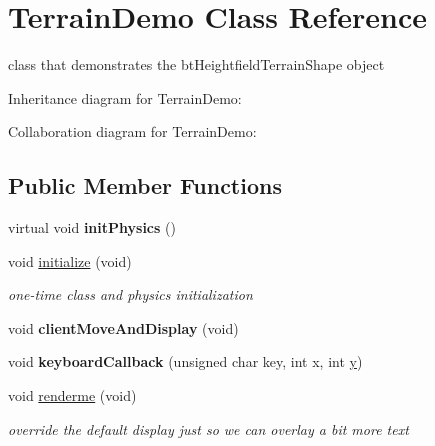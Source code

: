 \hypertarget{class_terrain_demo}{\section{Terrain\+Demo Class Reference}
\label{class_terrain_demo}
}


class that demonstrates the bt\+Heightfield\+Terrain\+Shape object  




Inheritance diagram for Terrain\+Demo\+:


Collaboration diagram for Terrain\+Demo\+:
\subsection*{Public Member Functions}
\begin{DoxyCompactItemize}
\item 
\hypertarget{class_terrain_demo_a76e348084508d2b18be774d0b4a4330e}{virtual void {\bfseries init\+Physics} ()}\label{class_terrain_demo_a76e348084508d2b18be774d0b4a4330e}

\item 
\hypertarget{class_terrain_demo_a571044d29b84f48708d3c8ca85567d8f}{void \hyperlink{class_terrain_demo_a571044d29b84f48708d3c8ca85567d8f}{initialize} (void)}\label{class_terrain_demo_a571044d29b84f48708d3c8ca85567d8f}

\begin{DoxyCompactList}\small\item\em one-\/time class and physics initialization \end{DoxyCompactList}\item 
\hypertarget{class_terrain_demo_ab00ee84fd73d2179ece57db05e952d55}{void {\bfseries client\+Move\+And\+Display} (void)}\label{class_terrain_demo_ab00ee84fd73d2179ece57db05e952d55}

\item 
\hypertarget{class_terrain_demo_a25863388a34683333b49e91866dfad8e}{void {\bfseries keyboard\+Callback} (unsigned char key, int x, int \hyperlink{_ice_utils_8h_aa7ffaed69623192258fb8679569ff9ba}{y})}\label{class_terrain_demo_a25863388a34683333b49e91866dfad8e}

\item 
\hypertarget{class_terrain_demo_af84a60483ebef1bb2a0bc093acd43703}{void \hyperlink{class_terrain_demo_af84a60483ebef1bb2a0bc093acd43703}{renderme} (void)}\label{class_terrain_demo_af84a60483ebef1bb2a0bc093acd43703}

\begin{DoxyCompactList}\small\item\em override the default display just so we can overlay a bit more text \end{DoxyCompactList}\end{DoxyCompactItemize}


